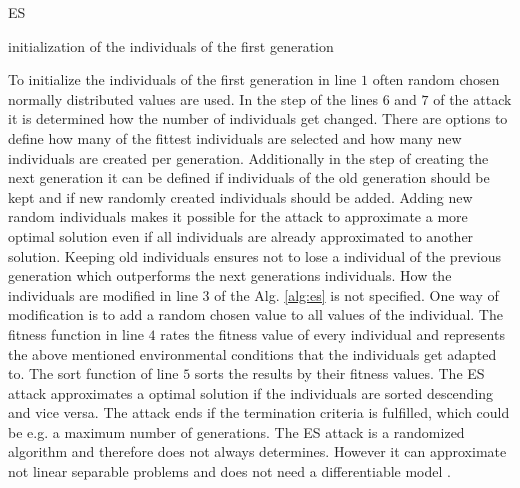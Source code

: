 \SetAlCapHSkip{0.2em}
\begin{algorithm}[H] %
\Indm
\SetAlgoLined
\caption{\acl{ES}}
\label{alg:es}
\Indp

initialization of the individuals of the first generation\\
\end{algorithm}

To initialize the individuals of the first generation in line $1$ often random chosen normally distributed values are used.
In the step of the lines $6$ and $7$ of the attack it is determined how the number of individuals get changed.
There are options to define how many of the fittest individuals are selected and how many new individuals are created per generation.
Additionally in the step of creating the next generation it can be defined if individuals of the old generation should be kept and if new randomly created individuals should be added.
Adding new random individuals makes it possible for the attack to approximate a more optimal solution even if all individuals are already approximated to another solution. %
Keeping old individuals ensures not to lose a individual of the previous generation which outperforms the next generations individuals.
How the individuals are modified in line $3$ of the Alg. \ref{alg:es} is not specified.
One way of modification is to add a random chosen value to all values of the individual.
The fitness function in line $4$ rates the fitness value of every individual and represents the above mentioned environmental conditions that the individuals get adapted to.
The sort function of line $5$ sorts the results by their fitness values.
The \ac{ES} attack approximates a optimal solution if the individuals are sorted descending and vice versa.
The attack ends if the termination criteria is fulfilled, which could be e.g. a maximum number of generations.
The \ac{ES} attack is a randomized algorithm and therefore does not always determines.
However it can approximate not linear separable problems and does not need a differentiable model \cite{Ruhrmair2010ModelingFunctions}.
	

